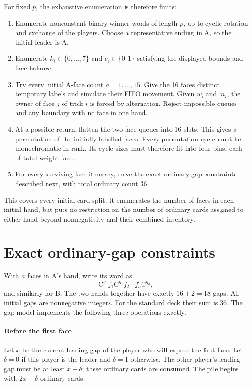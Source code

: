 \documentclass[11pt]{article}
\newcommand{\CC}{\mathrm C}
\begin{document}
For fixed $p$, the exhaustive enumeration is therefore finite:
\begin{enumerate}
\item Enumerate nonconstant binary winner words of length $p$, up to cyclic
rotation and exchange of the players. Choose a representative ending in A,
so the initial leader is A.
\item Enumerate $k_i\in\{0,\ldots,7\}$ and $e_i\in\{0,1\}$ satisfying
the displayed bounds and face balance.
\item Try every initial A-face count $a=1,\ldots,15$. Give the 16 faces
distinct temporary labels and simulate their FIFO movement. Given $w_i$ and
$m_i$, the owner of face $j$ of trick $i$ is forced by alternation. Reject
impossible queues and any boundary with no face in one hand.
\item At a possible return, flatten the two face queues into 16 slots. This
gives a permutation of the initially labelled faces. Every permutation cycle
must be monochromatic in rank. Its cycle sizes must therefore fit into four
bins, each of total weight four.
\item For every surviving face itinerary, solve the exact ordinary-gap
constraints described next, with total ordinary count 36.
\end{enumerate}

This covers every initial card split. It enumerates the number of faces in
each initial hand, but puts no restriction on the number of ordinary cards
assigned to either hand beyond nonnegativity and their combined inventory.

\section{Exact ordinary-gap constraints}\label{sec:gaps}

With $a$ faces in A's hand, write its word as
\[
\CC^{g_0}f_1\CC^{g_1}f_2\cdots f_a\CC^{g_a},
\]
and similarly for B. The two hands together have exactly $16+2=18$ gaps.
All initial gaps are nonnegative integers. For the standard deck their sum
is 36. The gap model implements the following three operations exactly.

\paragraph{Before the first face.}
Let $x$ be the current leading gap of the player who will expose the first
face. Let $\delta=0$ if this player is the leader and $\delta=1$ otherwise.
The other player's leading gap must be at least $x+\delta$; these ordinary
cards are consumed. The pile begins with $2x+\delta$ ordinary cards.
\end{document}
